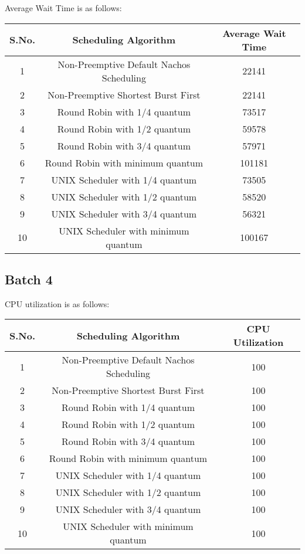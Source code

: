 \documentclass[]{article}
\begin{document}
Average Wait Time is as follows:

\begin{center}
\begin{tabular}{|c|c|c|}
\hline
S.No. & Scheduling Algorithm & Average Wait Time\\
\hline
1 & Non-Preemptive Default Nachos Scheduling & 22141\\
2 & Non-Preemptive Shortest Burst First & 22141\\
3 & Round Robin with 1/4 quantum & 73517\\
4 & Round Robin with 1/2 quantum & 59578\\
5 & Round Robin with 3/4 quantum & 57971\\
6 & Round Robin with minimum quantum & 101181\\
7 & UNIX Scheduler with 1/4 quantum & 73505\\
8 & UNIX Scheduler with 1/2 quantum & 58520\\
9 & UNIX Scheduler with 3/4 quantum & 56321\\
10 & UNIX Scheduler with minimum quantum & 100167\\
\hline
\end{tabular}
\end{center}



\subsection{Batch 4}

CPU utilization is as follows:

\begin{center}
\begin{tabular}{|c|c|c|}
\hline
S.No. & Scheduling Algorithm & CPU Utilization\\
\hline
1 & Non-Preemptive Default Nachos Scheduling & 100\\
2 & Non-Preemptive Shortest Burst First & 100\\
3 & Round Robin with 1/4 quantum & 100\\
4 & Round Robin with 1/2 quantum & 100\\
5 & Round Robin with 3/4 quantum & 100\\
6 & Round Robin with minimum quantum & 100\\
7 & UNIX Scheduler with 1/4 quantum & 100\\
8 & UNIX Scheduler with 1/2 quantum & 100\\
9 & UNIX Scheduler with 3/4 quantum & 100\\
10 & UNIX Scheduler with minimum quantum & 100\\
\hline
\end{tabular}
\end{center}
\end{document}
